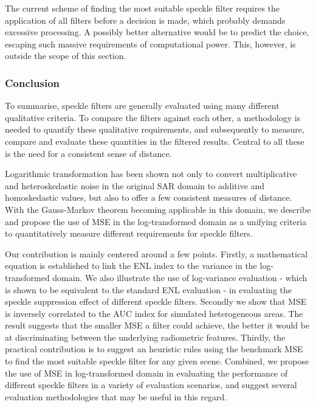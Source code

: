 The current scheme of finding the most suitable speckle filter requires the application of all filters before 
a decision is made, which probably demands excessive processing. 
A possibly better alternative would be to predict the choice, escaping such massive requirements of computational power.
This, however, is outside the scope of this section.

\subsubsection{Conclusion}

To summarise, speckle filters are generally evaluated using many different qualitative criteria.
To compare the filters against each other, a methodology is needed
  to quantify these qualitative requirements,
  and subsequently to measure, compare and evaluate these quantities in the filtered results.
Central to all these is the need for a consistent sense of distance.

Logarithmic transformation has been shown 
  not only to convert multiplicative and heteroskedastic noise in the original SAR domain to additive and homoskedastic values,
  but also to offer a few consistent measures of distance.
With the Gauss-Markov theorem becoming applicable in this domain, we describe and propose the use of MSE in the 
log-transformed domain as a unifying criteria to quantitatively measure different requirements for speckle filters.

Our contribution is mainly centered around a few points. 
Firstly, a mathematical equation is established to link the ENL index to the variance in the log-transformed domain. 
We also illustrate the use of log-variance evaluation -
  which is shown to be equivalent to the standard ENL evaluation -
  in evaluating the speckle suppression effect of different speckle filters.
Secondly we show that MSE is inversely correlated to the AUC index for simulated heterogeneous areas.
The result suggests that the smaller MSE a filter could achieve, the better it would
be at discriminating between the underlying radiometric features.
Thirdly, the practical contribution is to suggest an heuristic rules using the benchmark MSE to find 
the most suitable speckle filter for any given scene. 
Combined, we propose the use of MSE in log-transformed domain in evaluating the performance of different speckle filters in a variety of evaluation scenarios, and suggest several evaluation methodologies that may be useful in this regard.

